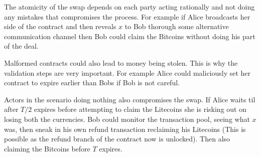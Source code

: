 The atomicity of the swap depends on each party acting rationally and not doing any mistakes that compromises the process. For example if Alice broadcasts her side of the contract and then reveals $x$ to Bob thorough some alternative communication channel then Bob could claim the Bitcoins without doing his part of the deal. 

Malformed contracts could also lead to money being stolen. This is why the validation steps are very important. For example Alice could maliciously set her contract to expire earlier than Bobs if Bob is not careful.

Actors in the scenario doing nothing also compromises the swap. If Alice waits til after $T/2$ expires before attempting to claim the Litecoins she is risking out on losing both the currencies. Bob could monitor the transaction pool, seeing what $x$ was, then sneak in his own refund transaction reclaiming his Litecoins (This is possible as the refund branch of the contract now is unlocked). Then also claiming the Bitcoins before $T$ expires.